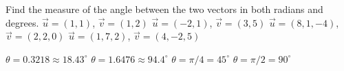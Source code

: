 
\begin{Exercise}[
name={},
title={}, 
difficulty=0,
origin={\cite{GHC}}]
Find the measure of the angle between the two vectors in both radians and degrees.
\Question $\vec u = (1,1)$, $\vec v = (1,2)$
\Question $\vec u = (-2,1)$, $\vec v = (3,5)$
\Question $\vec u = (8,1,-4)$, $\vec v = (2,2,0)$
\Question $\vec u = (1,7,2)$, $\vec v = (4,-2,5)$
\end{Exercise}

\begin{Answer}
\Question $\theta = 0.3218 \approx 18.43^\circ$
\Question $\theta = 1.6476 \approx 94.4^\circ$
\Question $\theta = \pi/4 = 45^\circ$
\Question $\theta = \pi/2 = 90^\circ$
\end{Answer}
